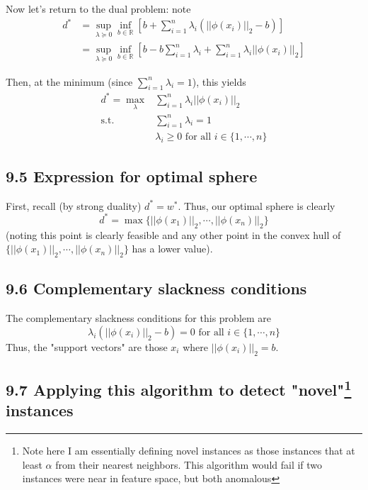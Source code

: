 \documentclass[paper=a4, fontsize=11pt]{scrartcl} %
\numberwithin{equation}{section} %
\numberwithin{figure}{section} %
\numberwithin{table}{section} %
\begin{document}
Now let's return to the dual problem: note
\begin{align*}
d^* &=\sup_{\lambda \succeq 0}  \inf_{b \in \mathbb{R}} \left[ b+ \sum_{i=1}^n \lambda_i (||\phi(x_i)||_2 - b) \right] \\
	&=\sup_{\lambda \succeq 0}  \inf_{b \in \mathbb{R}} \left[ b - b \sum_{i=1}^n \lambda_i + \sum_{i=1}^n \lambda_i ||\phi(x_i)||_2  \right]
\end{align*}

Then, at the minimum (since $\sum_{i = 1}^n \lambda_i = 1$), this yields
\begin{align*}
d^* = \max_{\lambda} & \sum_{i=1}^n \lambda_i ||\phi(x_i)||_2 \\
	\textrm{s.t.}  &\sum_{i=1}^n \lambda_i = 1 \\
	& \lambda_i \geq 0 \textrm{ for all } i \in \{1, \cdots, n\}
\end{align*}

\subsection*{9.5 Expression for optimal sphere}

First, recall (by strong duality) $d^* = w^*$. Thus, our optimal sphere is clearly
\[d^* = \max \{||\phi(x_1)||_2, \cdots, ||\phi(x_n)||_2\}\]
(noting this point is clearly feasible and any other point in the convex hull of $\{||\phi(x_1)||_2, \cdots, ||\phi(x_n)||_2\}$ has a lower value).

\subsection*{9.6 Complementary slackness conditions}

The complementary slackness conditions for this problem are
\[\lambda_i (||\phi(x_i)||_2 - b) = 0 \textrm{ for all } i \in \{1, \cdots, n \}\]
Thus, the "support vectors" are those $x_i$ where $||\phi(x_i)||_2 = b$.

\subsection*{9.7 Applying this algorithm to detect "novel"\footnote{Note here I am essentially defining novel instances as those instances that at least $\alpha$ from their nearest neighbors. This algorithm would fail if two instances were near in feature space, but both anomalous} instances}
\end{document}

